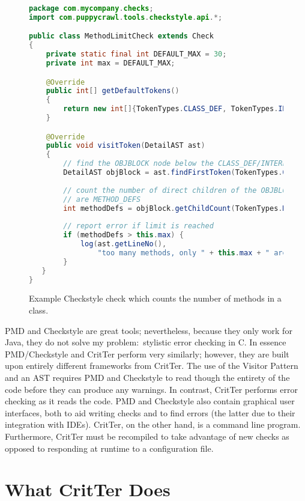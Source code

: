 \documentclass[12pt]{report}
\newcommand{\programName}{CritTer\xspace}
\begin{document}
\begin{figure}
\begin{lstlisting}[language=Java]
package com.mycompany.checks;
import com.puppycrawl.tools.checkstyle.api.*;

public class MethodLimitCheck extends Check
{
    private static final int DEFAULT_MAX = 30;
    private int max = DEFAULT_MAX;

    @Override
    public int[] getDefaultTokens()
    {
        return new int[]{TokenTypes.CLASS_DEF, TokenTypes.INTERFACE_DEF};
    }

    @Override
    public void visitToken(DetailAST ast)
    {
        // find the OBJBLOCK node below the CLASS_DEF/INTERFACE_DEF
        DetailAST objBlock = ast.findFirstToken(TokenTypes.OBJBLOCK);
        
        // count the number of direct children of the OBJBLOCK that 
        // are METHOD_DEFS
        int methodDefs = objBlock.getChildCount(TokenTypes.METHOD_DEF);
        
        // report error if limit is reached
        if (methodDefs > this.max) {
            log(ast.getLineNo(),
                "too many methods, only " + this.max + " are allowed");
        }
   }
}
\end{lstlisting}
\caption[Example Checkstyle Check]{Example Checkstyle check which counts the number of methods in a class.}
\label{checkstyle-rule}
\end{figure}

PMD and Checkstyle are great tools; nevertheless, because they only work for Java, they do not solve 
my problem:\ stylistic error checking in C. In essence PMD\slash Checkstyle and \programName perform 
very similarly; however, they are built upon entirely different frameworks from \programName. The use of 
the Visitor Pattern and an AST requires PMD and Checkstyle to read though the entirety of the code 
before they can produce any warnings. In contrast, \programName performs error checking as it reads 
the code. PMD and Checkstyle also contain graphical user interfaces, both to aid writing checks and to 
find errors (the latter due to their integration with IDEs). \programName, on the other hand, is a command 
line program. Furthermore, \programName must be recompiled to take advantage of new checks as 
opposed to responding at runtime to a configuration file.

\chapter{What \programName Does}
\end{document}
